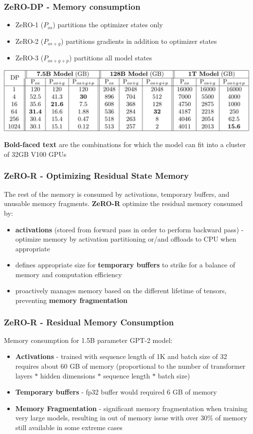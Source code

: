 \documentclass{beamer}
\begin{document}
\begin{frame}
    \frametitle{ZeRO-DP - Memory consumption}
    \begin{itemize}
        \item ZeRO-1 ($P_{os}$) partitions the optimizer states only
        \item ZeRO-2 ($P_{os+g}$) partitions gradients in addition to optimizer states
        \item ZeRO-3 ($P_{os+g+p}$) partitions all model states
    \end{itemize}
    \begin{center}
        \includegraphics[scale=1.25]{img/zero_memory_consumption_table.png}
    \end{center}
    \tiny{\textbf{Bold-faced text} are the combinations for which the model can fit into a cluster of 32GB V100 GPUs}
\end{frame}

\begin{frame}
    \frametitle{ZeRO-R - Optimizing Residual State Memory}
    The rest of the memory is consumed by  activations, temporary buffers, and unusable memory fragments. \textbf{ZeRO-R} optimize the residual memory consumed by:
    \begin{itemize}
        \item \textbf{activations} (stored from forward pass in order to perform backward pass) - optimize memory by activation partitioning or/and offloads to CPU when appropriate
        \item defines appropriate size for \textbf{temporary buffers} to strike for a balance of memory and computation efficiency
        \item proactively manages memory based on the different lifetime of tensors, preventing \textbf{memory fragmentation}
    \end{itemize}
\end{frame}

\begin{frame}
    \frametitle{ZeRO-R - Residual Memory Consumption}
    Memory consumption for 1.5B parameter GPT-2 model:
    \begin{itemize}
        \item \textbf{Activations} - trained with sequence length of 1K and batch size of 32 requires about 60 GB of memory (proportional to the number of transformer layers $*$ hidden dimensions $*$ sequence length $*$ batch size)
        \item \textbf{Temporary buffers} - fp32 buffer would required 6 GB of memory
        \item \textbf{Memory Fragmentation} - significant memory fragmentation when training very large models, resulting in out of memory issue with over 30\% of memory still available in some extreme cases
    \end{itemize}
\end{frame}
\end{document}
